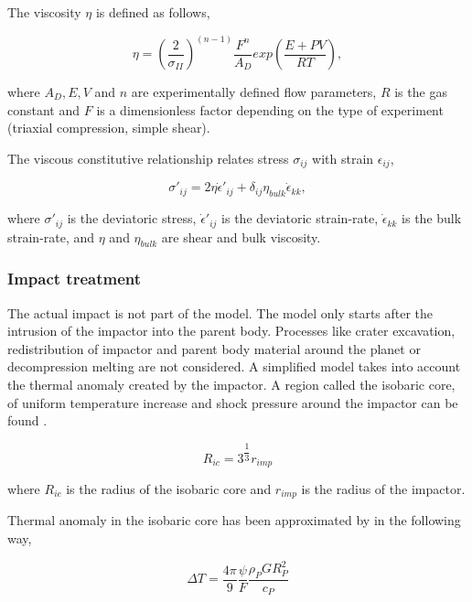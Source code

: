 The viscosity $\eta$ is defined as follows,

\begin{equation}
\eta = \left(\dfrac{2}{\sigma_{II}}\right)^{\left(n-1\right)}\dfrac{F^n}{A_D} exp{\left(\dfrac{E + P V}{R T}\right)},
\end{equation}

where $A_D, E, V$ and $n$ are experimentally defined flow parameters, $R$ is the gas constant and $F$ is a dimensionless factor depending on the type of experiment (triaxial compression, simple shear).

The viscous constitutive relationship relates stress $\sigma_{ij}$ with strain $\epsilon_{ij}$,

\begin{equation}
\sigma'_{ij} = 2\eta \dot{\epsilon}'_{ij} + \delta_{ij} \eta_{bulk} \dot{\epsilon}_{kk}, 
\end{equation}

where $\sigma'_{ij}$ is the deviatoric stress, $\dot{\epsilon}'_{ij}$ is the deviatoric strain-rate, $\dot{\epsilon}_{kk}$ is the bulk strain-rate, and $\eta$ and $\eta_{bulk}$ are shear and bulk viscosity.

\subsubsection{Impact treatment}

The actual impact is not part of the model. The model only starts after the intrusion of the impactor into the parent body. Processes like crater excavation, redistribution of impactor and parent body material around the planet or decompression melting are not considered. A simplified model takes into account the thermal anomaly created by the impactor. A region called the isobaric core, of uniform temperature increase and shock pressure around the impactor can be found \citep{Senshu2002}.

\begin{equation}
R_{ic} = 3^{\dfrac{1}{3}} r_{imp}
\end{equation}

where $R_{ic}$ is the radius of the isobaric core and $r_{imp}$ is the radius of the impactor.

Thermal anomaly in the isobaric core has been approximated by \citet{Monteux2007c} in the following way,

\begin{equation}
\Delta T = \dfrac{4 \pi}{9} \dfrac{\psi}{F} \dfrac{\rho_P G R_P^2}{c_P}
\end{equation}

